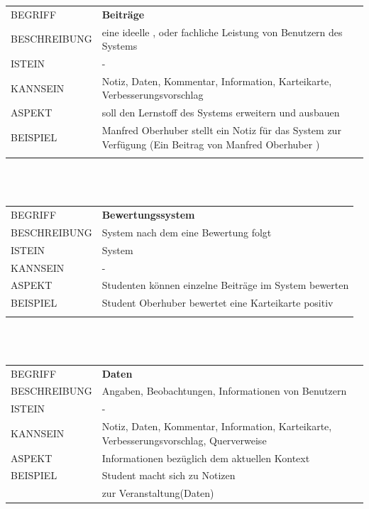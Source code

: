 \documentclass[12pt,a4paper]{article}
\begin{document}
\begin{tabular}{l p{12cm}}
	BEGRIFF 	 & \textbf{Beiträge} \\ 
	BESCHREIBUNG & eine ideelle , oder fachliche Leistung von Benutzern des Systems \\ 
	ISTEIN   	 &  -\\
	KANNSEIN 	 & Notiz, Daten, Kommentar, Information, Karteikarte, Verbesserungsvorschlag\\ 
	ASPEKT   	 & soll den Lernstoff des Systems erweitern und ausbauen\\
	BEISPIEL 	 & Manfred Oberhuber stellt ein Notiz für das System zur Verfügung
	(Ein Beitrag von Manfred Oberhuber )\\\\
	\hline
\end{tabular}\\\\  

\begin{tabular}{l p{12cm}}
	BEGRIFF 	 & \textbf{Bewertungssystem} \\ 
	BESCHREIBUNG & System nach dem eine Bewertung folgt\\ 
	ISTEIN   	 & System\\
	KANNSEIN 	 & - \\ 
	ASPEKT   	 & Studenten können einzelne Beiträge im System bewerten\\
	BEISPIEL 	 & Student Oberhuber bewertet eine Karteikarte positiv \\\\
	\hline
\end{tabular}\\\\  

\begin{tabular}{l p{12cm}}
	BEGRIFF 	 & \textbf{Daten} \\ 
	BESCHREIBUNG & Angaben, Beobachtungen, Informationen von Benutzern\\ 
	ISTEIN   	 & -\\
	KANNSEIN 	 & Notiz, Daten, Kommentar, Information, Karteikarte, Verbesserungsvorschlag, 					   Querverweise\\ 
	ASPEKT   	 & Informationen bezüglich dem aktuellen Kontext\\
	BEISPIEL 	 & Student macht sich zu Notizen\\
	& zur Veranstaltung(Daten) \\
	\hline
\end{tabular}\\ 
\end{document}
